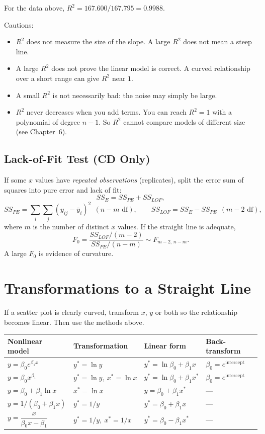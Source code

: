 For the data above, $R^2=167.600/167.795=0.9988$.

Cautions:
\begin{itemize}
  \item $R^2$ does not measure the size of the slope. A large $R^2$ does not mean a steep line.
  \item A large $R^2$ does not prove the linear model is correct. A curved relationship over a short range can give $R^2$ near $1$.
  \item A small $R^2$ is not necessarily bad: the noise may simply be large.
  \item $R^2$ never decreases when you add terms. You can reach $R^2=1$ with a polynomial of degree $n-1$. So $R^2$ cannot compare models of different size (see Chapter~6).
\end{itemize}

\subsection{Lack-of-Fit Test (CD Only)}

If some $x$ values have \emph{repeated observations} (replicates), split the error sum of squares into pure error and lack of fit:
\[ SS_E=SS_{PE}+SS_{LOF}, \]
\[ SS_{PE}=\sum_i\sum_j(y_{ij}-\bar{y}_i)^2\ \ (n-m\text{ df}),\qquad SS_{LOF}=SS_E-SS_{PE}\ \ (m-2\text{ df}), \]
where $m$ is the number of distinct $x$ values. If the straight line is adequate,
\[ F_0=\frac{SS_{LOF}/(m-2)}{SS_{PE}/(n-m)}\sim F_{m-2,\,n-m}. \]
A large $F_0$ is evidence of curvature.

\section{Transformations to a Straight Line}

If a scatter plot is clearly curved, transform $x$, $y$ or both so the relationship becomes linear. Then use the methods above.

\begin{center}
\begin{tabular}{llll}
\toprule
Nonlinear model & Transformation & Linear form & Back-transform \\
\midrule
$y=\beta_0e^{\beta_1x}$ & $y^*=\ln y$ & $y^*=\ln\beta_0+\beta_1x$ & $\beta_0=e^{\text{intercept}}$ \\
$y=\beta_0x^{\beta_1}$ & $y^*=\ln y,\ x^*=\ln x$ & $y^*=\ln\beta_0+\beta_1x^*$ & $\beta_0=e^{\text{intercept}}$ \\
$y=\beta_0+\beta_1\ln x$ & $x^*=\ln x$ & $y=\beta_0+\beta_1x^*$ & --- \\
$y=1/(\beta_0+\beta_1x)$ & $y^*=1/y$ & $y^*=\beta_0+\beta_1x$ & --- \\
$y=\dfrac x{\beta_0x-\beta_1}$ & $y^*=1/y,\ x^*=1/x$ & $y^*=\beta_0-\beta_1x^*$ & --- \\
\bottomrule
\end{tabular}
\end{center}

